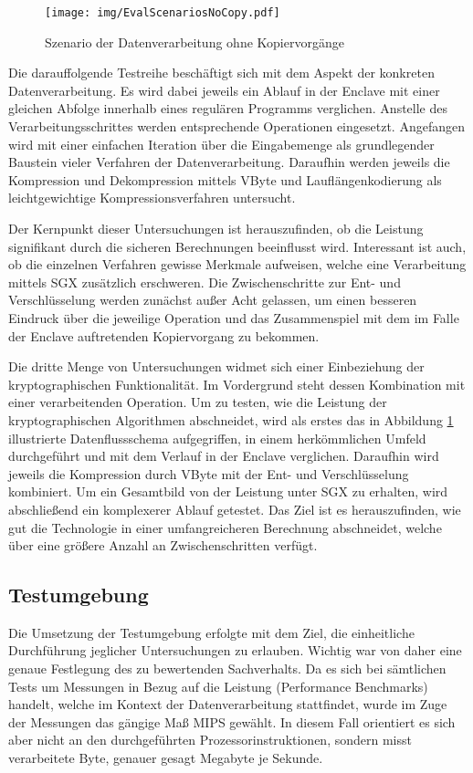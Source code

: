 \begin{figure}[H]
	\texttt{[image: img/EvalScenariosNoCopy.pdf]}
	\centering
	\caption{Szenario der Datenverarbeitung ohne Kopiervorgänge}
	\label{fig:scenarionocopy}
\end{figure}

Die darauffolgende Testreihe beschäftigt sich mit dem Aspekt der konkreten Datenverarbeitung. Es wird dabei jeweils ein Ablauf in der Enclave mit einer gleichen Abfolge innerhalb eines regulären Programms verglichen. Anstelle des Verarbeitungsschrittes werden entsprechende Operationen eingesetzt. Angefangen wird mit einer einfachen Iteration über die Eingabemenge als grundlegender Baustein vieler Verfahren der Datenverarbeitung. Daraufhin werden jeweils die Kompression und Dekompression mittels VByte und Lauflängenkodierung als leichtgewichtige Kompressionsverfahren untersucht.

Der Kernpunkt dieser Untersuchungen ist herauszufinden, ob die Leistung signifikant durch die sicheren Berechnungen beeinflusst wird. Interessant ist auch, ob die einzelnen Verfahren gewisse Merkmale aufweisen, welche eine Verarbeitung mittels \ac{SGX} zusätzlich erschweren. Die Zwischenschritte zur Ent- und Verschlüsselung werden zunächst außer Acht gelassen, um einen besseren Eindruck über die jeweilige Operation und das Zusammenspiel mit dem im Falle der Enclave auftretenden Kopiervorgang zu bekommen.

Die dritte Menge von Untersuchungen widmet sich einer Einbeziehung der kryptographischen Funktionalität. Im Vordergrund steht dessen Kombination mit einer verarbeitenden Operation. Um zu testen, wie die Leistung der kryptographischen Algorithmen abschneidet, wird als erstes das in Abbildung \ref{fig:scenarionocopy} illustrierte Datenflussschema aufgegriffen, in einem herkömmlichen Umfeld durchgeführt und mit dem Verlauf in der Enclave verglichen. Daraufhin wird jeweils die Kompression durch VByte mit der Ent- und Verschlüsselung kombiniert. Um ein Gesamtbild von der Leistung unter \ac{SGX} zu erhalten, wird abschließend ein komplexerer Ablauf getestet. Das Ziel ist es herauszufinden, wie gut die Technologie in einer umfangreicheren Berechnung abschneidet, welche über eine größere Anzahl an Zwischenschritten verfügt.

\subsection{Testumgebung}

Die Umsetzung der Testumgebung erfolgte mit dem Ziel, die einheitliche Durchführung jeglicher Untersuchungen zu erlauben. Wichtig war von daher eine genaue Festlegung des zu bewertenden Sachverhalts. Da es sich bei sämtlichen Tests um Messungen in Bezug auf die Leistung (Performance Benchmarks) handelt, welche im Kontext der Datenverarbeitung stattfindet, wurde im Zuge der Messungen das gängige Maß \ac{MIPS} gewählt. In diesem Fall orientiert es sich aber nicht an den durchgeführten Prozessorinstruktionen, sondern misst verarbeitete Byte, genauer gesagt Megabyte je Sekunde.

